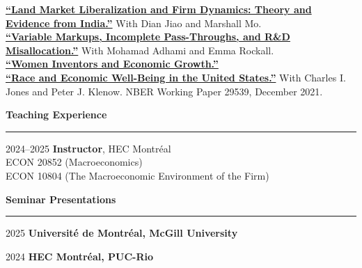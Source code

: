 \documentclass[12pt]{article}
\begin{document}
\begin{small}
\href{https://drive.google.com/file/d/1z8lTR8R5P9uCwSs1FLgQa9mQ6WbSRwEo/view}{\textbf{``Land Market Liberalization and Firm Dynamics: Theory and Evidence from India.''}} With Dian Jiao and Marshall Mo. \\[-0.5\baselineskip]

\href{https://jfbrou.github.io/papers/markups.pdf}{\textbf{``Variable Markups, Incomplete Pass-Throughs, and R\&D Misallocation.''}} With Mohamad Adhami and Emma Rockall. \\[-0.5\baselineskip]

\href{https://jfbrou.github.io/papers/hopper.pdf}{\textbf{``Women Inventors and Economic Growth.''}}\\[-0.5\baselineskip]

\href{http://klenow.com/BrouilletteJonesKlenow_Race_and_Welfare.pdf}{\textbf{``Race and Economic Well-Being in the United States.''}} With Charles I. Jones and Peter J. Klenow. NBER Working Paper 29539, December 2021.
\end{small}

\vspace{0.5cm}

{\large \textbf{Teaching Experience}} \\
\noindent\rule[0.5\baselineskip]{\textwidth}{1pt}

\begin{small}
2024--2025 \tabto{3cm} \textbf{Instructor}, HEC Montr\'eal \\
\tabto{3cm} \hspace{0.25cm} ECON 20852 (Macroeconomics) \\
\tabto{3cm} \hspace{0.25cm} ECON 10804 (The Macroeconomic Environment of the Firm)
\end{small}

\vspace{0.5cm}

{\large \textbf{Seminar Presentations}} \\
\noindent\rule[0.5\baselineskip]{\textwidth}{1pt}

\begin{small}

2025 \tabto{3cm} \textbf{Universit\'e de Montr\'eal, McGill University}

2024 \tabto{3cm} \textbf{HEC Montr\'eal, PUC-Rio}

\end{small}

\vspace{0.5cm}
\end{document}

